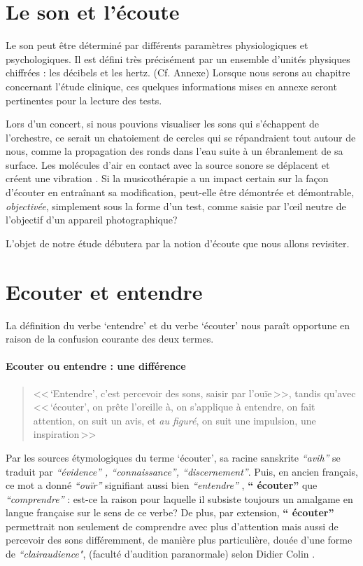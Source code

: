 
\section{Le son et l'écoute}
Le son peut être déterminé par différents paramètres
physiologiques et psychologiques.
Il est défini très précisément par un ensemble d'unités physiques chiffrées
: les décibels  et les hertz. (Cf. Annexe)
Lorsque nous serons au chapitre concernant l'étude clinique,
ces quelques informations mises en annexe seront pertinentes pour la lecture des tests.

Lors d'un concert, si nous pouvions visualiser les sons qui
s'échappent de l'orchestre, ce serait un chatoiement de cercles qui se
répandraient tout autour de nous, comme
la propagation des
ronds dans l'eau suite à un ébranlement de sa surface.
Les molécules d'air en contact avec la source sonore se déplacent et
créent une vibration \autocite {bencivelli:pourquoi,}.
Si la
musicothérapie a un impact certain sur la façon d'écouter en
entraînant sa
modification, peut-elle être  démontrée et démontrable, \textsl{objectivée},
simplement sous la forme d'un test, comme saisie par
l'\oe il neutre de l'objectif d'un appareil
photographique?

L'objet de notre étude débutera par la notion d'écoute que nous allons revisiter.
\section{Ecouter et entendre}
La définition du verbe `entendre' et du verbe `écouter'
nous paraît opportune
en raison de la confusion courante des deux termes.
\paragraph{Ecouter ou entendre : une différence}
\begin{quote}<<\,`Entendre', c'est  percevoir des sons, saisir par l'ouïe\,>>, tandis qu'avec
<<\,`écouter', on prête l'oreille à, on s'applique à entendre, on fait attention, on suit un avis, et \emph{au figuré}, on suit une impulsion, une inspiration\,>> \autocite[361--385]{hachette:dictionnaire} \end{quote}
Par les sources étymologiques du
terme `écouter',
 sa racine sanskrite \emph{ ``avih'' } se traduit par
 \emph{``évidence'' , ``connaissance'', ``discernement''}. Puis, en ancien
 français, ce mot a donné \textit{``ouïr''} signifiant aussi bien \textit{``entendre''} ,
\textbf{`` écouter'' } que \textit{``comprendre''} \autocite {etymologieWeb}:
 est-ce la raison
pour laquelle il subsiste toujours un amalgame en langue française
sur le sens de ce verbe?
De plus, par extension, \textbf{`` écouter'' }
permettrait non seulement de comprendre avec plus d'attention
mais aussi de percevoir des sons différemment, de manière plus particulière, douée d'une forme de
\textit{``clairaudience"}, (faculté d'audition paranormale) selon Didier
Colin \autocite {colin2015}.

